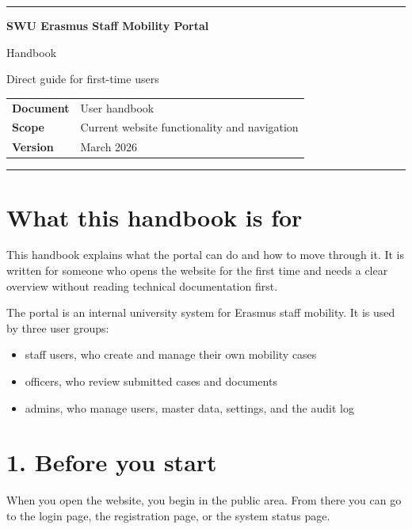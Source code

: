 \documentclass[11pt,a4paper]{article}
\newcommand{\handbooktitle}[1]{{\Huge\bfseries\color{swudark} #1\par}}
\newcommand{\handbooksubtitle}[1]{{\Large\color{swured} #1\par}}
\begin{document}
\hypersetup{pageanchor=false}
\thispagestyle{empty}
\vspace*{1.5cm}
{\color{swured}\rule{\textwidth}{1.4pt}}
\vspace{1.1cm}
\handbooktitle{SWU Erasmus Staff Mobility Portal}
\vspace{0.2cm}
\handbooksubtitle{Handbook}
\vspace{0.45cm}
{\large Direct guide for first-time users\par}
\vspace{1.6cm}

\begin{tabular}{@{}p{3.2cm}p{9.3cm}@{}}
\textbf{Document} & User handbook \\
\textbf{Scope} & Current website functionality and navigation \\
\textbf{Version} & March 2026 \\
\end{tabular}

\vfill
{\color{swured}\rule{\textwidth}{1.4pt}}
\newpage
{}
\hypersetup{pageanchor=true}

\section*{What this handbook is for}
This handbook explains what the portal can do and how to move through it. It is written for someone who opens the website for the first time and needs a clear overview without reading technical documentation first.

The portal is an internal university system for Erasmus staff mobility. It is used by three user groups:

\begin{itemize}
  \item staff users, who create and manage their own mobility cases
  \item officers, who review submitted cases and documents
  \item admins, who manage users, master data, settings, and the audit log
\end{itemize}

\section*{1. Before you start}
When you open the website, you begin in the public area. From there you can go to the login page, the registration page, or the system status page.
\end{document}
